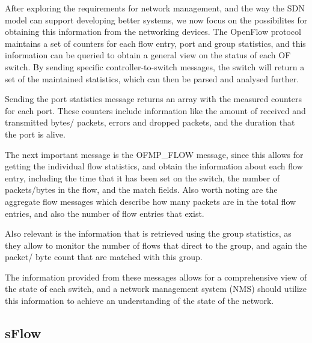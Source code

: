 After exploring the requirements for network management, and the way the SDN model can support developing better systems, we now focus on the possibilites for obtaining this information from the networking devices. The OpenFlow 
protocol maintains a set of counters for each flow entry, port and group statistics, and this information can be queried to obtain a general view on the status of each OF switch. By sending specific controller-to-switch messages,
the switch will return a set of the maintained statistics, which can then be parsed and analysed further. 
\par Sending the port statistics message returns an array with the measured counters for each port. These counters include information like the amount of received and transmitted bytes/ packets, errors and dropped packets, and the
duration that the port is alive. 
\par The next important message is the \textsc{OFMP\_FLOW} message, since this allows for getting the individual flow statistics, and obtain the information about each flow entry, including the time that it has been set on the switch,
the number of packets/bytes in the flow, and the match fields. Also worth noting are the aggregate flow messages which describe how many packets are in the total flow entries, and also the number of flow entries that exist.
\par Also relevant is the information that is retrieved using the group statistics, as they allow to monitor the number of flows that direct to the group, and again the packet/ byte count that are matched with this group.
\par The information provided from these messages allows for a comprehensive view of the state of each switch, and a network management system (NMS) should utilize this information to achieve an understanding of the 
state of the network. 

\subsection {sFlow}

